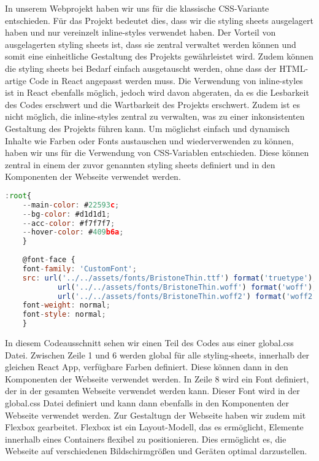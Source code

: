 In unserem Webprojekt haben wir uns für die klassische CSS-Variante entschieden. Für das Projekt bedeutet dies, dass wir die styling sheets ausgelagert haben und nur vereinzelt inline-styles verwendet haben.
Der Vorteil von ausgelagerten styling sheets ist, dass sie zentral verwaltet werden können und somit eine einheitliche Gestaltung des Projekts gewährleistet wird. Zudem können die styling sheets bei Bedarf einfach ausgetauscht werden, ohne dass der HTML-artige Code in React angepasst werden muss.
Die Verwendung von inline-styles ist in React ebenfalls möglich, jedoch wird davon abgeraten, da es die Lesbarkeit des Codes erschwert und die Wartbarkeit des Projekts erschwert. Zudem ist es nicht möglich, die inline-styles zentral zu verwalten, was zu einer inkonsistenten Gestaltung des Projekts führen kann.
Um möglichst einfach und dynamisch Inhalte wie Farben oder Fonts austauschen und wiederverwenden zu können, haben wir uns für die Verwendung von CSS-Variablen entschieden. Diese können zentral in einem der zuvor genannten styling sheets definiert und in den Komponenten der Webseite verwendet werden.

\begin{lstlisting}[language=JavaScript, caption={global.css}, label={lst:globalcss}]
:root{
    --main-color: #22593c;
    --bg-color: #d1d1d1;
    --acc-color: #f7f7f7;
    --hover-color: #409b6a;
    }
    
    @font-face {
    font-family: 'CustomFont';
    src: url('../../assets/fonts/BristoneThin.ttf') format('truetype'),
            url('../../assets/fonts/BristoneThin.woff') format('woff'),
            url('../../assets/fonts/BristoneThin.woff2') format('woff2');
    font-weight: normal;
    font-style: normal;
    }
\end{lstlisting}

In diesem Codeausschnitt sehen wir einen Teil des Codes aus einer global.css Datei. Zwischen Zeile 1 und 6 werden global für alle styling-sheets, innerhalb der gleichen React App, verfügbare Farben definiert. Diese können dann in den Komponenten der Webseite verwendet werden.
In Zeile 8 wird ein Font definiert, der in der gesamten Webseite verwendet werden kann. Dieser Font wird in der global.css Datei definiert und kann dann ebenfalls in den Komponenten der Webseite verwendet werden.
Zur Gestaltugn der Webseite haben wir zudem mit Flexbox gearbeitet. Flexbox ist ein Layout-Modell, das es ermöglicht, Elemente innerhalb eines Containers flexibel zu positionieren. Dies ermöglicht es, die Webseite auf verschiedenen Bildschirmgrößen und Geräten optimal darzustellen.

